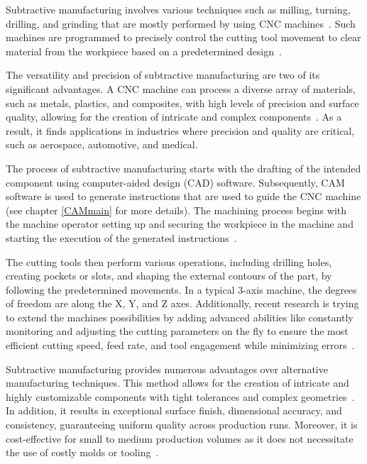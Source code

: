 Subtractive manufacturing involves various techniques such as milling, turning, drilling, and grinding that are mostly performed by using CNC machines~\cite{Kumar.2020}. Such machines are programmed to precisely control the cutting tool movement to clear material from the workpiece based on a predetermined design~\cite{Amanullah.2017}.

The versatility and precision of subtractive manufacturing are two of its significant advantages. A CNC machine can process a diverse array of materials, such as metals, plastics, and composites, with high levels of precision and surface quality, allowing for the creation of intricate and complex components~\cite{Tomaz.2021,Yang.2019}. As a result, it finds applications in industries where precision and quality are critical, such as aerospace, automotive, and medical.

The process of subtractive manufacturing starts with the drafting of the intended component using computer-aided design (CAD) software. Subsequently, CAM software is used to generate instructions that are used to guide the CNC machine (see chapter \ref{CAMmain} for more details). The machining process begins with the machine operator setting up and securing the workpiece in the machine and starting the execution of the generated instructions~\cite{Nee.2015}.

The cutting tools then perform various operations, including drilling holes, creating pockets or slots, and shaping the external contours of the part, by following the predetermined movements. In a typical 3-axis machine, the degrees of freedom are along the X, Y, and Z axes. Additionally, recent research is trying to extend the machines possibilities by adding advanced abilities like constantly monitoring and adjusting the cutting parameters on the fly to ensure the most efficient cutting speed, feed rate, and tool engagement while minimizing errors~\cite{Tien.2021}.


Subtractive manufacturing provides numerous advantages over alternative manufacturing techniques. This method allows for the creation of intricate and highly customizable components with tight tolerances and complex geometries~\cite{Jayawardane.2023}. In addition, it results in exceptional surface finish, dimensional accuracy, and consistency, guaranteeing uniform quality across production runs. Moreover, it is cost-effective for small to medium production volumes as it does not necessitate the use of costly molds or tooling~\cite{Gu.2018}.

